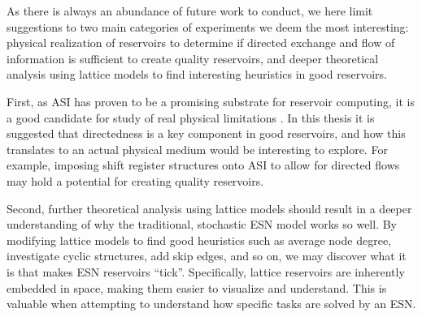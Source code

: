 As there is always an abundance of future work to conduct, we here limit
suggestions to two main categories of experiments we deem the most interesting:
physical realization of reservoirs to determine if directed exchange and flow of
information is sufficient to create quality reservoirs, and deeper theoretical
analysis using lattice models to find interesting heuristics in good reservoirs.

First, as ASI has proven to be a promising substrate for reservoir computing, it
is a good candidate for study of real physical limitations
\cite{jensen_reservoir_2020}. In this thesis it is suggested that directedness
is a key component in good reservoirs, and how this translates to an actual
physical medium would be interesting to explore. For example, imposing shift
register structures onto ASI to allow for directed flows may hold a potential
for creating quality reservoirs.

Second, further theoretical analysis using lattice models should result in a
deeper understanding of why the traditional, stochastic ESN model works so
well. By modifying lattice models to find good heuristics such as average node
degree, investigate cyclic structures, add skip edges, and so on, we may
discover what it is that makes ESN reservoirs ``tick''. Specifically, lattice
reservoirs are inherently embedded in space, making them easier to visualize and
understand. This is valuable when attempting to understand how specific tasks
are solved by an ESN.

